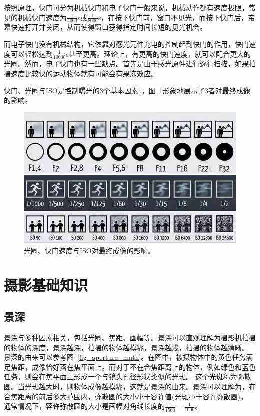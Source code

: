 \documentclass{ctexart}
\begin{document}
按照原理，快门可分为机械快门和电子快门一般来说，机械动作都有速度极限，常见的机械快门速度为$\frac{1}{4000}$s或$\frac{1}{8000}$s，在按下快门前，窗口不见光，而按下快门后，帘幕快速打开并关闭，从而使得窗口获得指定时间长短的见光机会。

而电子快门没有机械结构，它依靠对感光元件充电的控制起到快门的作用，快门速度可以轻松达到$\frac{1}{10000}$s甚至更高。理论上，有更高的快门速度，就可以配合更大的光圈。然而，电子快门也有一些缺点。首先是由于感光原件进行逐行扫描，如果拍摄速度比较快的运动物体就有可能会有果冻效应。

快门、光圈与ISO是控制曝光的3个基本因素~\cite{iso_aperture_shutter}，图~\ref{fig_iso_aperture_shutter}形象地展示了3者对最终成像的影响。

\begin{figure}[h!]
    \centering
    \includegraphics[width=.7\linewidth]{imgs/iso_aperture_shutter.jpg}
    \caption{光圈、快门速度与ISO对最终成像的影响。}
    \label{fig_iso_aperture_shutter}
\end{figure}

\section{摄影基础知识}

\subsection{景深~\cite{depth_of_field}}
景深与多种因素相关，包括光圈、焦距、画幅等。景深可以直观理解为摄影机拍摄的物体的深度，景深越深，拍摄的物体越模糊，景深越浅，拍摄的物体越清晰。
景深的由来可以参考图~\ref{fig_aperture_math}。在图中，被摄物体中的黄色任务满足焦距，成像恰好落在焦平面上。而对于不在合焦距离上的物体，例如绿色和蓝色任务，则会在焦平面上形成一个与镜头孔径形状类似的光斑。
这个光斑称为弥散圆。当光斑越大时，则物体成像越模糊，这就是景深的由来。景深可以理解为，在合焦距离的前后多大范围内，弥散圆的大小小于容许值(光斑小于容许弥散圆)。
通常情况下，容许弥散圆的大小是画幅对角线长度的$\frac{1}{1500} - \frac{1}{1000}$。
\end{document}
